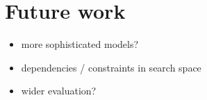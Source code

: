 \chapter{Future work}
\begin{itemize}
	\item more sophisticated models?
	\item dependencies / constraints in search space
	\item wider evaluation?
\end{itemize}
